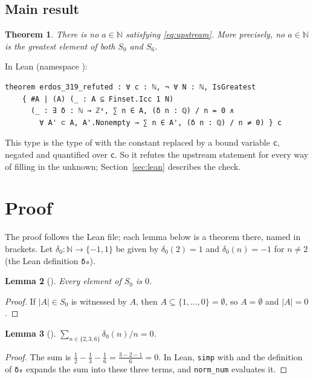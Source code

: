 \documentclass[11pt]{amsart}
\theoremstyle{plain}
\newtheorem{theorem}{Theorem}
\newtheorem{lemma}[theorem]{Lemma}
\theoremstyle{definition}
\newcommand{\N}{\mathbb{N}}
\begin{document}
\subsection{Main result}

\begin{theorem}\label{thm:main}
There is no $a\in\N$ satisfying \eqref{eq:upstream}. More precisely, no $a\in\N$ is the greatest element of both $S_0$ and $S_6$.
\end{theorem}

In Lean (namespace ):
\begin{lstlisting}
theorem erdos_319_refuted : ∀ c : ℕ, ¬ ∀ N : ℕ, IsGreatest
    { #A | (A) (_ : A ⊆ Finset.Icc 1 N)
      (_ : ∃ δ : ℕ → ℤˣ, ∑ n ∈ A, (δ n : ℚ) / n = 0 ∧
        ∀ A' ⊂ A, A'.Nonempty → ∑ n ∈ A', (δ n : ℚ) / n ≠ 0) } c
\end{lstlisting}
This type is the type of  with the constant  replaced by a bound variable \texttt{c}, negated and quantified over \texttt{c}. So it refutes the upstream statement for every way of filling in the unknown; Section~\ref{sec:lean} describes the check.

\section{Proof}\label{sec:proof}

The proof follows the Lean file; each lemma below is a theorem there, named in brackets. Let $\delta_0\colon\N\to\{-1,1\}$ be given by $\delta_0(2)=1$ and $\delta_0(n)=-1$ for $n\ne 2$ (the Lean definition \texttt{δ₀}).

\begin{lemma}[]\label{lem:S0}
Every element of $S_0$ is $0$.
\end{lemma}

\begin{proof}
If $|A|\in S_0$ is witnessed by $A$, then $A\subseteq\{1,\dots,0\}=\emptyset$, so $A=\emptyset$ and $|A|=0$.
\end{proof}

\begin{lemma}[]\label{lem:sum}
$\sum_{n\in\{2,3,6\}}\delta_0(n)/n=0$.
\end{lemma}

\begin{proof}
The sum is $\frac12-\frac13-\frac16=\frac{3-2-1}{6}=0$. In Lean, \texttt{simp} with  and the definition of \texttt{δ₀} expands the sum into these three terms, and \texttt{norm\_num} evaluates it.
\end{proof}
\end{document}
